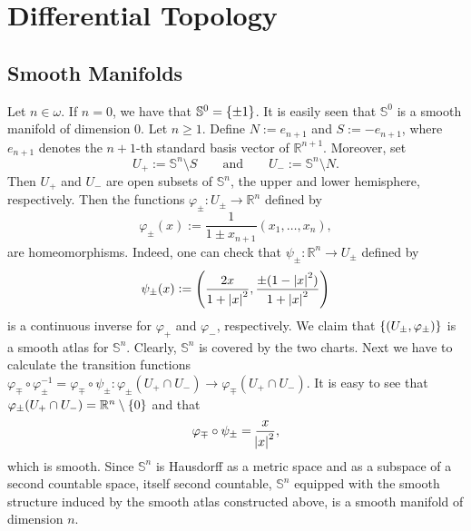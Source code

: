 \chapter{Differential Topology}
\section*{Smooth Manifolds}

\begin{example}[$n$-Spheres]
	Let $n \in \omega$. If $n = 0$, we have that $\mathbb{S}^0 = \cbr{\pm 1}$. It is easily seen that $\mathbb{S}^0$ is a smooth manifold of dimension $0$. Let $n \geq 1$. Define $N := e_{n + 1}$ and $S := -e_{n + 1}$, where $e_{n + 1}$ denotes the $n + 1$-th standard basis vector of $\mathbb{R}^{n + 1}$. Moreover, set
	\begin{equation*}
		U_+ := \mathbb{S}^n \setminus S \qquad \text{and} \qquad U_- := \mathbb{S}^n \setminus N.
	\end{equation*}
	Then $U_+$ and $U_-$ are open subsets of $\mathbb{S}^n$, the upper and lower hemisphere, respectively. Then the functions $\varphi_\pm : U_\pm \to \mathbb{R}^n$ defined by
	\begin{equation*}
		\varphi_\pm(x) := \frac{1}{1 \pm x_{n + 1}}(x_1,\dots,x_n),
	\end{equation*}
	\noindent are homeomorphisms. Indeed, one can check that $\psi_\pm : \mathbb{R}^n \to U_\pm$ defined by
	\begin{equation*}
		\psi_\pm(x) := \del[4]{\frac{2x}{1 + \abs[0]{x}^2}, \frac{\pm(1 - \abs[0]{x}^2)}{1 + \abs[0]{x}^2}} 
	\end{equation*}
	\noindent is a continuous inverse for $\varphi_+$ and $\varphi_-$, respectively. We claim that $\cbr[0]{(U_\pm,\varphi_\pm)}$ is a smooth atlas for $\mathbb{S}^n$. Clearly, $\mathbb{S}^n$ is covered by the two charts. Next we have to calculate the transition functions $\varphi_\mp \circ \varphi^{-1}_\pm = \varphi_\mp \circ \psi_\pm : \varphi_\pm(U_+ \cap U_-) \to \varphi_\mp(U_+ \cap U_-)$. It is easy to see that $\varphi_\pm(U_+ \cap U_-) = \mathbb{R}^n \setminus \cbr{0}$ and that
	\begin{equation*}
		\varphi_\mp \circ \psi_\pm = \frac{x}{\abs{x}^2},
	\end{equation*}
	\noindent which is smooth. Since $\mathbb{S}^n$ is Hausdorff as a metric space and as a subspace of a second countable space, itself second countable, $\mathbb{S}^n$ equipped with the smooth structure induced by the smooth atlas constructed above, is a smooth manifold of dimension $n$.
\end{example}
